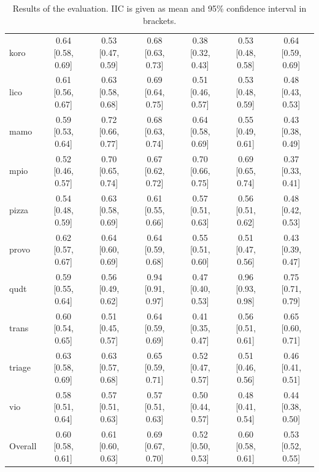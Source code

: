 \begin{table}[htbp]
\begin{widepage}
\begin{tabular}{|l|cccccc|}
      koro & 0.64 [0.58, 0.69] & 0.53 [0.47, 0.59] & 0.68 [0.63, 0.73] & 0.38 [0.32, 0.43] & 0.53 [0.48, 0.58] & 0.64 [0.59, 0.69] \\
      lico & 0.61 [0.56, 0.67] & 0.63 [0.58, 0.68] & 0.69 [0.64, 0.75] & 0.51 [0.46, 0.57] & 0.53 [0.48, 0.59] & 0.48 [0.43, 0.53] \\
      mamo & 0.59 [0.53, 0.64] & 0.72 [0.66, 0.77] & 0.68 [0.63, 0.74] & 0.64 [0.58, 0.69] & 0.55 [0.49, 0.61] & 0.43 [0.38, 0.49] \\
      mpio & 0.52 [0.46, 0.57] & 0.70 [0.65, 0.74] & 0.67 [0.62, 0.72] & 0.70 [0.66, 0.75] & 0.69 [0.65, 0.74] & 0.37 [0.33, 0.41] \\
      pizza & 0.54 [0.48, 0.59] & 0.63 [0.58, 0.69] & 0.61 [0.55, 0.66] & 0.57 [0.51, 0.63] & 0.56 [0.51, 0.62] & 0.48 [0.42, 0.53] \\
      provo & 0.62 [0.57, 0.67] & 0.64 [0.60, 0.69] & 0.64 [0.59, 0.68] & 0.55 [0.51, 0.60] & 0.51 [0.47, 0.56] & 0.43 [0.39, 0.47] \\
      qudt & 0.59 [0.55, 0.64] & 0.56 [0.49, 0.62] & 0.94 [0.91, 0.97] & 0.47 [0.40, 0.53] & 0.96 [0.93, 0.98] & 0.75 [0.71, 0.79] \\
      trans & 0.60 [0.54, 0.65] & 0.51 [0.45, 0.57] & 0.64 [0.59, 0.69] & 0.41 [0.35, 0.47] & 0.56 [0.51, 0.61] & 0.65 [0.60, 0.71] \\
      triage & 0.63 [0.58, 0.69] & 0.63 [0.57, 0.68] & 0.65 [0.59, 0.71] & 0.52 [0.47, 0.57] & 0.51 [0.46, 0.56] & 0.46 [0.41, 0.51] \\
      vio & 0.58 [0.51, 0.64] & 0.57 [0.51, 0.63] & 0.57 [0.51, 0.63] & 0.50 [0.44, 0.57] & 0.48 [0.41, 0.54] & 0.44 [0.38, 0.50]\\
      \hline
      Overall & 0.60 [0.58, 0.61] & 0.61 [0.60, 0.63] & 0.69 [0.67, 0.70] & 0.52 [0.50, 0.53] & 0.60 [0.58, 0.61] & 0.53 [0.52, 0.55] \\
      \hline
    \end{tabular}
  \end{widepage}
  \caption{Results of the evaluation. IIC is given as mean and 95\% confidence interval in brackets.}
\end{table}

